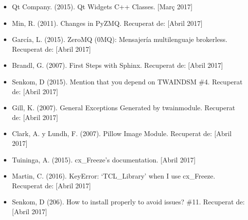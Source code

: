 \documentclass[letterpaper,11pt,catalan]{sphinxmanual}
\begin{document}
\begin{itemize}
\item {} 
Qt Company. (2015). Qt Widgets C++ Classes.   {[}Març 2017{]}

\item {} 
Min, R. (2011). Changes in PyZMQ.  Recuperat de:  {[}Abril 2017{]}

\item {} 
García, L. (2015). ZeroMQ (0MQ): Mensajería multilenguaje brokerless.  Recuperat de:  {[}Abril 2017{]}

\item {} 
Brandl, G. (2007). First Steps with Sphinx.  Recuperat de:  {[}Abril 2017{]}

\item {} 
Senkom, D (2015). Mention that you depend on TWAINDSM \#4.  Recuperat de:  {[}Abril 2017{]}

\item {} 
Gill, K. (2007). General Exceptions Generated by twainmodule.  Recuperat de:  {[}Abril 2017{]}

\item {} 
Clark, A. y Lundh, F. (2007). Pillow Image Module.  Recuperat de:  {[}Abril 2017{]}

\item {} 
Tuininga, A. (2015). cx\_Freeze’s documentation.   {[}Abril 2017{]}

\item {} 
Martin, C. (2016). KeyError: `TCL\_Library' when I use cx\_Freeze.  Recuperat de:  {[}Abril 2017{]}

\item {} 
Senkom, D (206). How to install properly to avoid issues? \#11.  Recuperat de:  {[}Abril 2017{]}


\end{itemize}
\end{document}
